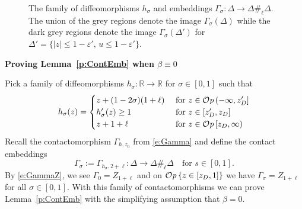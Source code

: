 \documentclass[12pt]{paper}
\theoremstyle{plain}
\theoremstyle{definition}
\newcommand{\eps}{\varepsilon}
\newcommand{\abs}[1]{\left| #1 \right|}
\newcommand{\R}{{\mathbb{R}}}
\def\Op{{\mathcal O}{\it p}\,}
\numberwithin{figure}{section}
\begin{document}

\begin{figure}[h]
   \centering
   \def\svgwidth{450pt}
   
   \caption{The family of diffeomorphisms $h_\sigma$ and embeddings $\Gamma_\sigma: \Delta \to \Delta\#_\ell \Delta$.  
   The union of the grey regions denote the image $\Gamma_\sigma(\Delta)$ while
   the dark grey regions denote the image $\Gamma_\sigma(\Delta')$ for $\Delta' = \{\abs{z} \leq 1-\eps',\, u \leq 1-\eps'\}$.}
  \label{f:graphH}
\end{figure} 


\textbf{Proving Lemma~\ref{p:ContEmb} when $\beta \equiv 0$}

Pick a family of diffeomorphisms $h_\sigma: \R \to \R$ for $\sigma \in [0,1]$ such that
	\begin{equation}\label{e:defh}
		h_\sigma(z) = \begin{cases}
			z+(1-2\sigma)(1+\ell) & \mbox{ for $z \in \Op (-\infty, z_D']$}\\
			h_\sigma'(z) \geq 1 & \mbox{ for $z \in [z_D', z_D]$}\\
			z+1+\ell & \mbox{ for $z \in \Op [z_D, \infty) $}
			\end{cases}
	\end{equation}	
	Recall the contactomorphism $\Gamma_{h, z_0}$ from \eqref{e:Gamma} and define the contact embeddings
	\begin{equation}\label{e:GammaS}
			\Gamma_\sigma := \Gamma_{h_\sigma, 2+\ell}: \Delta \to \Delta\#_{\ell}\Delta
			\quad\mbox{for $s \in [0,1]$.}
	\end{equation}
	By \eqref{e:GammaZ}, we see $\Gamma_0 = Z_{1+\ell}$ and on $\Op\{z \in [z_D, 1]\}$
	we have $\Gamma_\sigma = Z_{1+\ell}$ for all $\sigma \in [0,1]$.	
With this family of contactomorphisms we can prove Lemma~\ref{p:ContEmb} with the simplifying assumption that $\beta = 0$.
	
\end{document}
